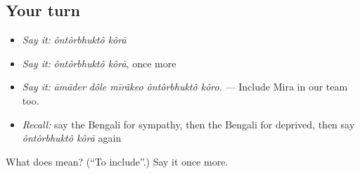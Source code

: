 \subsection*{Your turn}
\begin{itemize}
\raggedright
  \item \emph{Say it:} \emph{ôntôrbhuktô kôrā}
  \item \emph{Say it:} \emph{ôntôrbhuktô kôrā}, once more
  \item \emph{Say it:} \emph{āmāder dôle mīrākeo ôntôrbhuktô kôro.} — Include Mira in our team too.
  \item \emph{Recall:} say the Bengali for sympathy, then the Bengali for deprived, then say \emph{ôntôrbhuktô kôrā} again
\end{itemize}

\begin{tcolorbox}[breakable,colback=teal!4,colframe=teal!35!black,title={Before you move on}]
What does   mean? (\textquotedblleft{}To include\textquotedblright{}.) Say it once more.
\end{tcolorbox}
